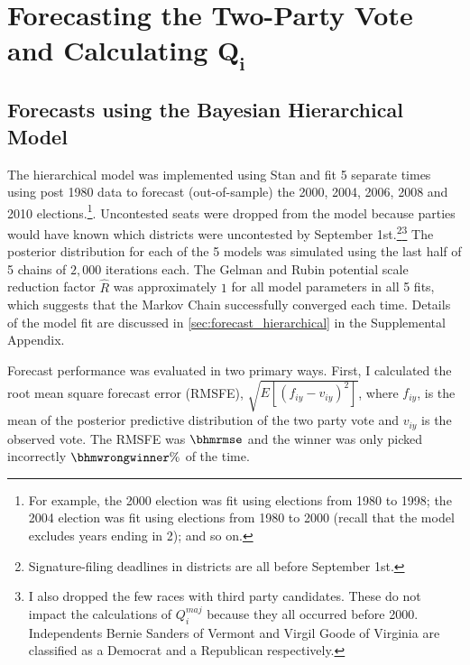 \documentclass[12pt,final,fleqn]{article}
\theoremstyle{plain}
\begin{document}
\section{Forecasting the Two-Party Vote and Calculating $\mathbf{Q_i}$}\label{sec:forecasting-results}
\subsection{Forecasts using the Bayesian Hierarchical Model} \label{sec: results hierarchical model}
The hierarchical model was implemented using Stan \citep{dev2016rstan} and fit 5 separate times using post 1980 data to forecast (out-of-sample) the 2000, 2004, 2006, 2008 and 2010 elections.\footnote{For example, the 2000 election was fit using elections from 1980 to 1998; the 2004 election was fit using elections from 1980 to 2000 (recall that the model excludes years ending in 2); and so on.}. Uncontested seats were dropped from the model because parties would have known which districts were uncontested by September 1st.\footnote{Signature-filing deadlines in districts are all before September 1st.}\footnote{I also dropped the few races with third party candidates. These do not impact the calculations of $Q_i^{maj}$ because they all occurred before 2000. Independents Bernie Sanders of Vermont and Virgil Goode of Virginia are classified as a Democrat and a Republican respectively.} The posterior distribution for each of the 5 models was simulated using the last half of 5 chains of $2,000$ iterations each. The Gelman and Rubin potential scale reduction factor $\hat{R}$ was approximately $1$ for all model parameters in all 5 fits, which suggests that the Markov Chain successfully converged each time. 
 Details of the model fit are discussed in \autoref*{sec:forecast_hierarchical} in the Supplemental Appendix.

Forecast performance was evaluated in two primary ways. First, I calculated the root mean square forecast error (RMSFE), $\sqrt{E[(f_{iy} - v_{iy})^2]}$, where $f_{iy}$, is the mean of the posterior predictive distribution of the two party vote and $v_{iy}$ is the observed vote. The RMSFE was $\bhmrmse$ and the winner was only picked incorrectly $\bhmwrongwinner\%$ of the time. 
\end{document}

